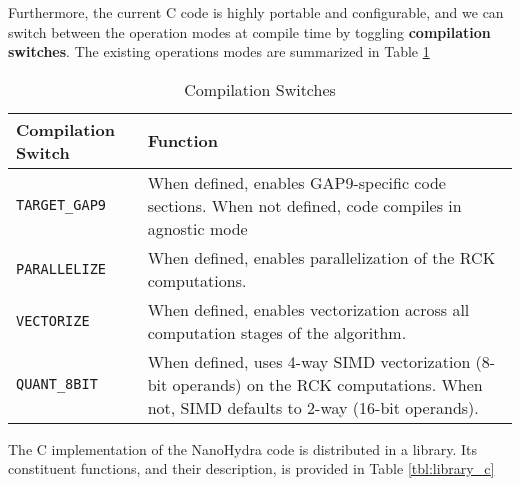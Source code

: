     Furthermore, the current C code is highly portable and configurable, and we can switch between the operation modes at compile time by toggling \textbf{compilation switches}.
    The existing operations modes are summarized in Table \ref{tbl:compile_switches}

    \begin{table}[h!]
    \begin{tabular}{||p{1.5in}|p{4in}||}
        \hline
        Compilation Switch & Function  \\

        \hline\hline
        \verb|TARGET_GAP9| & When defined, enables GAP9-specific code sections. When not defined, code compiles in agnostic mode \\
        \hline
        \verb|PARALLELIZE| & When defined, enables parallelization of the RCK computations. \\
        \hline
        \verb|VECTORIZE|   & When defined, enables vectorization across all computation stages of the algorithm. \\
        \hline
        \verb|QUANT_8BIT|  & When defined, uses 4-way SIMD vectorization (8-bit operands) on the RCK computations. When not, SIMD defaults to 2-way (16-bit operands). \\
        \hline
    \end{tabular}
    \caption{Compilation Switches}
    \label{tbl:compile_switches}
    \end{table}

    The C implementation of the NanoHydra code is distributed in a library. Its constituent functions, and their description, is
    provided in Table \ref{tbl:library_c}

